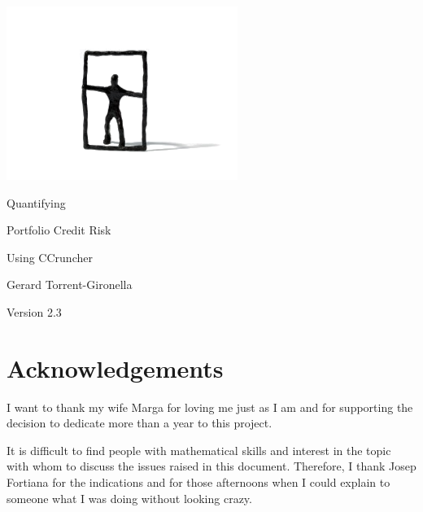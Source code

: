 \documentclass[11pt,fleqn]{book} %
\def\numversion{2.3}
\begin{document}
\begingroup
\thispagestyle{empty}
\vspace*{-2.5cm}
\centerline{\includegraphics[angle=0]{./Pictures/logo.png}}
\centering
\vspace*{1.0cm}
\par\normalfont\fontsize{35}{55}\sffamily\selectfont
Quantifying\par 
Portfolio Credit Risk\par
Using CCruncher\par
\vspace*{0.5cm}
{\huge Gerard Torrent-Gironella}\par
\vspace*{1cm}
\par\normalfont\fontsize{18}{18}\sffamily\selectfont
Version \numversion\par
\endgroup


\newpage

\section*{Acknowledgements}
I want to thank my wife Marga for loving me just as I am and for supporting 
the decision to dedicate more than a year to this project.

It is difficult to find people with mathematical skills and interest in the 
topic with whom to discuss the issues raised in this document. Therefore, 
I thank Josep Fortiana for the indications and for those afternoons when I 
could explain to someone what I was doing without looking crazy.
\end{document}
